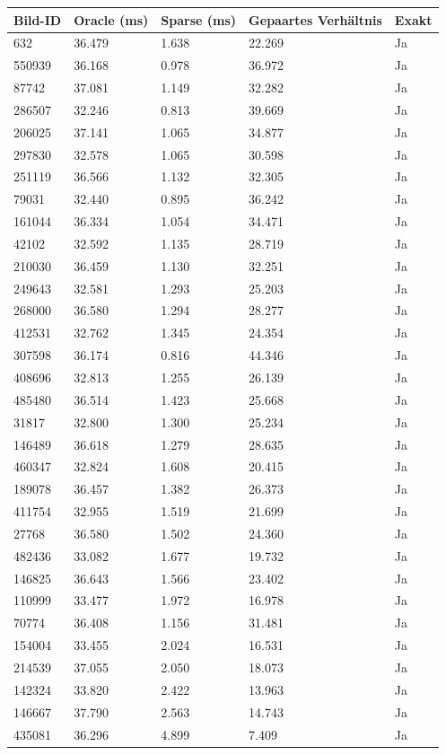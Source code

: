 \begin{tabular}{lllll}
\hline
Bild-ID & Oracle (ms) & Sparse (ms) & Gepaartes Verhältnis & Exakt \\
\hline
632 & 36.479 & 1.638 & 22.269 & Ja \\
550939 & 36.168 & 0.978 & 36.972 & Ja \\
87742 & 37.081 & 1.149 & 32.282 & Ja \\
286507 & 32.246 & 0.813 & 39.669 & Ja \\
206025 & 37.141 & 1.065 & 34.877 & Ja \\
297830 & 32.578 & 1.065 & 30.598 & Ja \\
251119 & 36.566 & 1.132 & 32.305 & Ja \\
79031 & 32.440 & 0.895 & 36.242 & Ja \\
161044 & 36.334 & 1.054 & 34.471 & Ja \\
42102 & 32.592 & 1.135 & 28.719 & Ja \\
210030 & 36.459 & 1.130 & 32.251 & Ja \\
249643 & 32.581 & 1.293 & 25.203 & Ja \\
268000 & 36.580 & 1.294 & 28.277 & Ja \\
412531 & 32.762 & 1.345 & 24.354 & Ja \\
307598 & 36.174 & 0.816 & 44.346 & Ja \\
408696 & 32.813 & 1.255 & 26.139 & Ja \\
485480 & 36.514 & 1.423 & 25.668 & Ja \\
31817 & 32.800 & 1.300 & 25.234 & Ja \\
146489 & 36.618 & 1.279 & 28.635 & Ja \\
460347 & 32.824 & 1.608 & 20.415 & Ja \\
189078 & 36.457 & 1.382 & 26.373 & Ja \\
411754 & 32.955 & 1.519 & 21.699 & Ja \\
27768 & 36.580 & 1.502 & 24.360 & Ja \\
482436 & 33.082 & 1.677 & 19.732 & Ja \\
146825 & 36.643 & 1.566 & 23.402 & Ja \\
110999 & 33.477 & 1.972 & 16.978 & Ja \\
70774 & 36.408 & 1.156 & 31.481 & Ja \\
154004 & 33.455 & 2.024 & 16.531 & Ja \\
214539 & 37.055 & 2.050 & 18.073 & Ja \\
142324 & 33.820 & 2.422 & 13.963 & Ja \\
146667 & 37.790 & 2.563 & 14.743 & Ja \\
435081 & 36.296 & 4.899 & 7.409 & Ja \\
\hline
\end{tabular}
